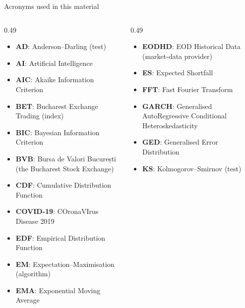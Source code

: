 
{
\begin{frame}[noframenumbering]
    \titlepage
\end{frame}
}
\begin{frame}{Acronyms used in this material}
\begin{columns}[T]
\begin{column}{0.49\textwidth}
\begin{itemize}\setlength{\itemsep}{0pt}
    \item \textbf{AD}: Anderson–Darling (test)
    \item \textbf{AI}: Artificial Intelligence
    \item \textbf{AIC}: Akaike Information Criterion
    \item \textbf{BET}: Bucharest Exchange Trading (index)
    \item \textbf{BIC}: Bayesian Information Criterion
    \item \textbf{BVB}: Bursa de Valori București (the Bucharest Stock Exchange)
    \item \textbf{CDF}: Cumulative Distribution Function
    \item \textbf{COVID-19}: COronaVIrus Disease 2019
    \item \textbf{EDF}: Empirical Distribution Function
    \item \textbf{EM}: Expectation–Maximisation (algorithm)
    \item \textbf{EMA}: Exponential Moving Average
\end{itemize}
\end{column}
\begin{column}{0.49\textwidth}
\begin{itemize}\setlength{\itemsep}{0pt}
    \item \textbf{EODHD}: EOD Historical Data (market-data provider)
    \item \textbf{ES}: Expected Shortfall
    \item \textbf{FFT}: Fast Fourier Transform
    \item \textbf{GARCH}: Generalised AutoRegressive Conditional Heteroskedasticity
    \item \textbf{GED}: Generalised Error Distribution
    \item \textbf{KS}: Kolmogorov–Smirnov (test)

\end{itemize}
\end{column}
\end{columns}
\end{frame}
